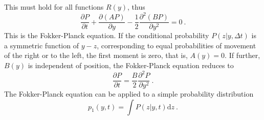 \documentclass[11pt,a4paper]{article}
\newcommand{\dif}{\mathrm{d}}
\begin{document}
This must hold for all functions $R(y)$, thus
\begin{equation}
\dfrac{\partial P}{\partial t} + \dfrac{\partial (AP)}{\partial y} - \dfrac{1}{2} \dfrac{\partial^2 (BP)}{\partial y^2}  = 0 ~.
\end{equation}
This is the Fokker-Planck equation. If the conditional probability $P(z|y, \Delta t)$ is a symmetric function of $y-z$, corresponding to equal probabilities of movement of the right or to the left, the first moment is zero, that is, $A(y) = 0$. If further, $B(y)$ is independent of position, the Fokker-Planck equation reduces to 
\begin{equation}
\dfrac{\partial P}{\partial t} = \dfrac{B}{2} \dfrac{\partial^2 P}{\partial y^2}  ~.
\end{equation}
The Fokker-Planck equation can be applied to a simple probability distribution 
\begin{equation}
p_1(y, t) = \int P(z|y, t) \dif z ~.
\end{equation}































\end{document}
